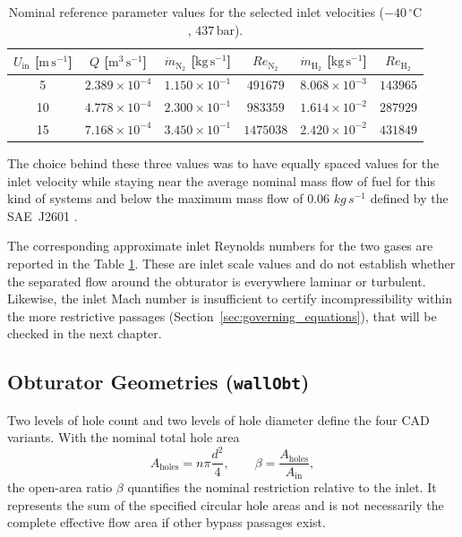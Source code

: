 \begin{table}[htbp]
\centering
\small
\begin{tabular}{@{}cccccc@{}}
\toprule
$U_{\mathrm{in}}$ [$\mathrm{m\,s^{-1}}$] &
$Q$ [$\mathrm{m^3\,s^{-1}}$] &
$\dot m_{\mathrm{N}_2}$ [$\mathrm{kg\,s^{-1}}$] &
$Re_{\mathrm{N}_2}$ &
$\dot m_{\mathrm{H}_2}$ [$\mathrm{kg\,s^{-1}}$]&
$Re_{\mathrm{H}_2}$\\
\midrule
5  & $2.389\times10^{-4}$ & $1.150\times10^{-1}$ & $491679$ & $8.068\times10^{-3}$&  $143965$\\
10 & $4.778\times10^{-4}$ & $2.300\times10^{-1}$ &  $983359$ & $1.614\times10^{-2}$&  $287929$\\
15 & $7.168\times10^{-4}$ & $3.450\times10^{-1}$ &  $1475038$ & $2.420\times10^{-2}$&  $431849$\\
\bottomrule
\end{tabular}
\caption{Nominal reference parameter values for the selected inlet velocities ($-40\,^{\circ}\mathrm{C}$, $437\,\mathrm{bar}$).}
\label{tab:flow_regimes}

\end{table}

The choice behind these three values was to have equally spaced values for the inlet velocity while staying near the average nominal mass flow of fuel for this kind of systems and below the maximum mass flow of $0.06$ $kg\,s^{-1}$ defined by the SAE~J2601 \cite{sae_j2601}.  

The corresponding approximate inlet Reynolds numbers for the two gases are reported in the Table \ref{tab:flow_regimes}. These are inlet scale values and do not establish whether the separated flow around the obturator is everywhere laminar or turbulent. Likewise, the inlet Mach number is insufficient to certify incompressibility within the more restrictive passages (Section~\ref{sec:governing_equations}), that will be checked in the next chapter.

\subsection{Obturator Geometries (\texttt{wallObt})}
Two levels of hole count and two levels of hole diameter define the four CAD variants. With the nominal total hole area
\begin{equation}
    A_{\mathrm{holes}}=n\pi\frac{d^2}{4},
    \qquad
    \beta=\frac{A_{\mathrm{holes}}}{A_{\mathrm{in}}},
    \label{eq:open_area_ratio}
\end{equation}
the open-area ratio $\beta$ quantifies the nominal restriction relative to the inlet. It represents the sum of the specified circular hole areas and is not necessarily the complete effective flow area if other bypass passages exist.

